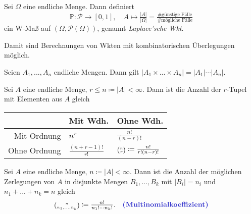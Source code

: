 \documentclass{cheat-sheet}
\renewcommand{\P}{\mathbb{P}}
\let\myBinom\binom
\renewcommand{\binom}[2]{\mathsmaller{\myBinom{#1}{#2}}}
\begin{document}
\begin{defn}
  Sei $\Omega$ eine endliche Menge. Dann definiert
  \[ \P : \mathcal{P} \to [0, 1], \quad A \mapsto \tfrac{|A|}{|\Omega|} = \tfrac{\text{\# günstige Fälle}}{\text{\# mögliche Fälle}} \]
  ein W-Maß auf $(\Omega, \mathcal{P}(\Omega))$, genannt \emph{Laplace'sche Wkt}.
\end{defn}

\begin{bem}
  Damit sind Berechnungen von Wkten mit kombinatorischen Überlegungen möglich.
\end{bem}


\begin{lem}
  Seien $A_1, ..., A_n$ endliche Mengen. Dann gilt $| A_1 \times ... \times A_n | = |A_1| \cdots |A_n|$.
\end{lem}

\begin{lem}
  Sei $A$ eine endliche Menge, $r \leq n \coloneqq |A| < \infty$. Dann ist die Anzahl der $r$-Tupel mit Elementen aus $A$ gleich

  \begin{center}
    \begin{tabular}{ r | l l }
      & Mit Wdh. & Ohne Wdh. \\ \hline
      Mit Ordnung & $n^r$ & $\tfrac{n!}{(n-r)!}$ \\
      Ohne Ordnung & $\tfrac{(n+r-1)!}{r!}$ & $\binom{n}{r} \coloneqq \tfrac{n!}{r!(n-r)!}$
    \end{tabular}
  \end{center}
\end{lem}



\begin{lem}
  Sei $A$ eine endliche Menge, $n \coloneqq |A| < \infty$. Dann ist die Anzahl der möglichen Zerlegungen von $A$ in disjunkte Mengen $B_1, ..., B_k$ mit $|B_i| = n_i$ und $n_1 + ... + n_k = n$ gleich
  \[
    \binom{n}{n_1, ..., n_k} \coloneqq \tfrac{n!}{n_1! \cdots n_k!}. \quad \text{\emph{(Multinomialkoeffizient)}}
  \]
\end{lem}



\end{document}
